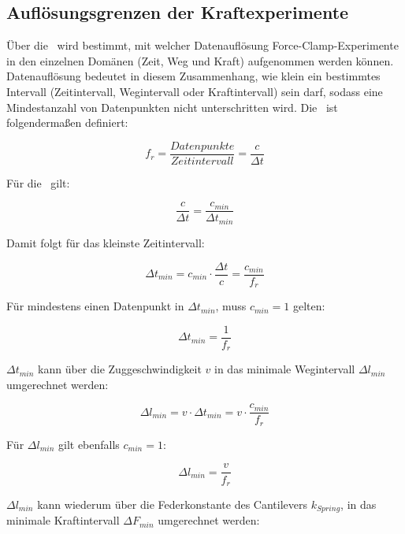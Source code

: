 \subsection{Auflösungsgrenzen der Kraftexperimente}
\label{subsec:auflösungsgrenzen_der_kraftexperimente}

Über die \samplerate~wird bestimmt, mit welcher Datenauflösung Force-Clamp-Experimente in den einzelnen Domänen (Zeit, Weg und Kraft) aufgenommen werden können. Datenauflösung bedeutet in diesem Zusammenhang, wie klein ein bestimmtes Intervall (Zeitintervall, Wegintervall oder Kraftintervall) sein darf, sodass eine Mindestanzahl von Datenpunkten nicht unterschritten wird. Die \samplerate~ist folgendermaßen definiert:

\begin{equation}
	f_r = \frac{Datenpunkte}{Zeitintervall} = \frac{c}{\Delta t}
\end{equation}

Für die \samplerate~gilt:

\[ \frac{c}{\Delta t} = \frac{c_{min}}{\Delta t_{min}} \]

Damit folgt für das kleinste Zeitintervall:

\begin{equation}
	\Delta t_{min} = c_{min} \cdot \frac{\Delta t}{c} =  \frac{c_{min}}{f_r}
\end{equation}

Für mindestens einen Datenpunkt in $\Delta t_{min}$, muss $c_{min} = 1$ gelten:

\begin{equation}
		\Delta t_{min} = \frac{1}{f_r}
\end{equation}

$\Delta t_{min}$ kann über die Zuggeschwindigkeit $v$ in das minimale Wegintervall $\Delta l_{min}$ umgerechnet werden:

\begin{equation}
	\Delta l_{min} = v \cdot \Delta t_{min} = v \cdot \frac{c_{min}}{f_r}
\end{equation}

Für $\Delta l_{min}$ gilt ebenfalls $c_{min} = 1$:

\begin{equation}
	\Delta l_{min} = \frac{v}{f_r}
\end{equation}

 $\Delta l_{min}$ kann wiederum über die Federkonstante des Cantilevers $k_{Spring}$, in das minimale Kraftintervall $\Delta F_{min}$ umgerechnet werden:

